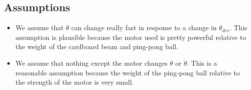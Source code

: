 \documentclass[a4paper]{article}
\begin{document}
\subsection*{Assumptions}
\begin{itemize}
\item We assume that $\dot{\theta}$ can change really fast in response to a change in $\theta_{des}$. This assumption is plausible because the motor used is pretty powerful relative to the weight of the cardboard beam and ping-pong ball.
\item We assume that nothing except the motor changes $\theta$ or $\dot{\theta}$. This is a reasonable assumption because the weight of the ping-pong ball relative to the strength of the motor is very small.
\end{itemize}
\end{document}
